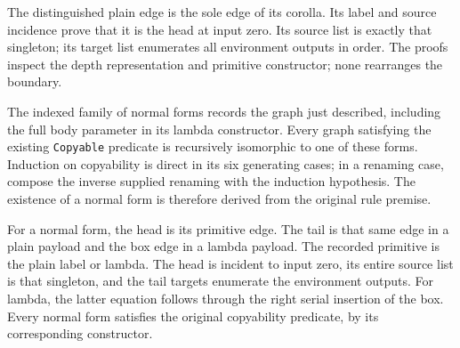 The distinguished plain edge is the sole edge of its corolla. Its label and
source incidence prove that it is the head at input zero. Its source list is
exactly that singleton; its target list enumerates all environment outputs in
order. The proofs inspect the depth representation and primitive constructor;
none rearranges the boundary.





The indexed family of normal forms records the graph just described, including
the full body parameter in its lambda constructor. Every graph satisfying the
existing \texttt{Copyable} predicate is recursively isomorphic to one of these
forms. Induction on copyability is direct in its six generating cases; in a
renaming case, compose the inverse supplied renaming with the induction
hypothesis. The existence of a normal form is therefore derived from the
original rule premise.



For a normal form, the head is its primitive edge. The tail is that same edge
in a plain payload and the box edge in a lambda payload. The recorded primitive
is the plain label or lambda. The head is incident to input zero, its entire
source list is that singleton, and the tail targets enumerate the environment
outputs. For lambda, the latter equation follows through the right serial
insertion of the box. Every normal form satisfies the original copyability
predicate, by its corresponding constructor.






